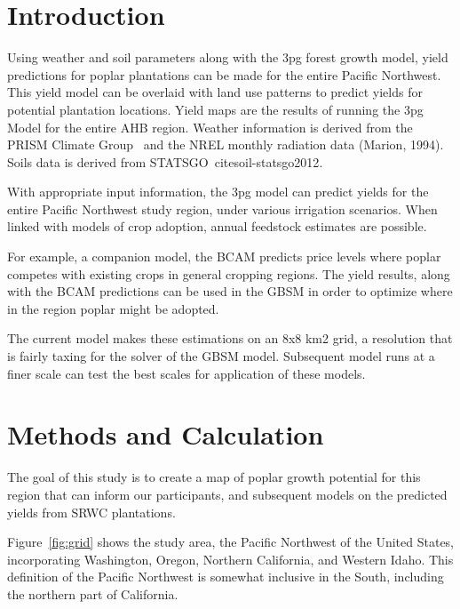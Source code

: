 \documentclass[preprint,12pt]{elsarticle}
\begin{document}

\section{Introduction}
\label{sec:introduction}

Using weather and soil parameters along with the \ac{3pg} forest
growth model, yield predictions for poplar plantations can be made for
the entire Pacific Northwest.  This yield model can be overlaid with
land use patterns to predict yields for potential plantation
locations.  Yield maps are the results of running the \ac{3pg} Model for
the entire \ac{AHB} region. Weather information is derived from the PRISM
Climate Group~\cite{Daly2008a} and the \acf{NREL} monthly radiation
data (Marion, 1994). Soils data is derived from
\acf{STATSGO}~cite{soil-statsgo2012}.

With appropriate input information, the \ac{3pg} model can predict
yields for the entire Pacific Northwest study region, under various
irrigation scenarios.  When linked with models of crop adoption,
annual feedstock estimates are possible.

For example, a companion model, the \acf{BCAM} predicts price levels
where poplar competes with existing crops in general cropping regions.
The yield results, along with the \ac{BCAM} predictions can be used in
the \acf{GBSM} in order to optimize where in the region poplar might
be adopted.

The current model makes these estimations on an 8x8 km2 grid, a
resolution that is fairly taxing for the solver of the \ac{GBSM}
model.  Subsequent model runs at a finer scale can test the best
scales for application of these models.

\section{Methods and Calculation}

The goal of this study is to create a map of poplar growth potential
for this region that can inform our participants, and subsequent
models on the predicted yields from \ac{SRWC} plantations.

Figure~\ref{fig:grid} shows the study area, the Pacific Northwest of
the United States, incorporating Washington, Oregon, Northern
California, and Western Idaho.  This definition of the Pacific
Northwest is somewhat inclusive in the South, including the northern
part of California.
\end{document}
